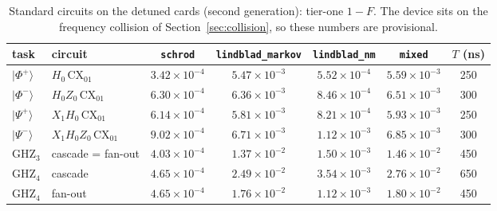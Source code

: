 \documentclass[10pt]{article}
\begin{document}
\begin{table}[htbp]
\centering
\caption{Standard circuits on the detuned cards (second generation): tier-one
$1-F$. The device sits on the frequency collision of
Section~\ref{sec:collision}, so these numbers are provisional.}
\label{tab:standard}
\small
\begin{tabular}{llccccc}
\toprule
task & circuit & \texttt{schrod} & \texttt{lindblad\_markov} & \texttt{lindblad\_nm} & \texttt{mixed} & $T$ (ns) \\
\midrule
$|\Phi^+\rangle$ & $H_0\,\mathrm{CX}_{01}$          & $3.42\times10^{-4}$ & $5.47\times10^{-3}$ & $5.52\times10^{-4}$ & $5.59\times10^{-3}$ & 250 \\
$|\Phi^-\rangle$ & $H_0 Z_0\,\mathrm{CX}_{01}$      & $6.30\times10^{-4}$ & $6.36\times10^{-3}$ & $8.46\times10^{-4}$ & $6.51\times10^{-3}$ & 300 \\
$|\Psi^+\rangle$ & $X_1 H_0\,\mathrm{CX}_{01}$      & $6.14\times10^{-4}$ & $5.81\times10^{-3}$ & $8.21\times10^{-4}$ & $5.93\times10^{-3}$ & 250 \\
$|\Psi^-\rangle$ & $X_1 H_0 Z_0\,\mathrm{CX}_{01}$  & $9.02\times10^{-4}$ & $6.71\times10^{-3}$ & $1.12\times10^{-3}$ & $6.85\times10^{-3}$ & 300 \\
GHZ$_3$ & cascade = fan-out & $4.03\times10^{-4}$ & $1.37\times10^{-2}$ & $1.50\times10^{-3}$ & $1.46\times10^{-2}$ & 450 \\
GHZ$_4$ & cascade           & $4.65\times10^{-4}$ & $2.49\times10^{-2}$ & $3.54\times10^{-3}$ & $2.76\times10^{-2}$ & 650 \\
GHZ$_4$ & fan-out           & $4.65\times10^{-4}$ & $1.76\times10^{-2}$ & $1.12\times10^{-3}$ & $1.80\times10^{-2}$ & 450 \\
\bottomrule
\end{tabular}
\end{table}
\end{document}

